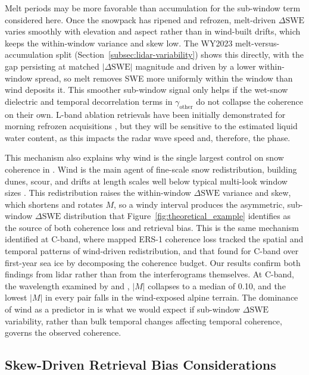 \documentclass[tc, manuscript]{copernicus}
\begin{document}
Melt periods may be more favorable than accumulation for the sub-window term considered here. Once the snowpack has ripened and refrozen, melt-driven $\Delta\mathrm{SWE}$ varies smoothly with elevation and aspect rather than in wind-built drifts, which keeps the within-window variance and skew low. The WY2023 melt-versus-accumulation split (Section~\ref{subsec:lidar-variability}) shows this directly, with the gap persisting at matched $|\Delta\mathrm{SWE}|$ magnitude and driven by a lower within-window spread, so melt removes SWE more uniformly within the window than wind deposits it. This smoother sub-window signal only helps if the wet-snow dielectric and temporal decorrelation terms in $\gamma_\mathrm{other}$ do not collapse the coherence on their own. L-band ablation retrievals have been initially demonstrated for morning refrozen acquisitions \citep{Tarricone2023}, but they will be sensitive to the estimated liquid water content, as this impacts the radar wave speed and, therefore, the phase.

This mechanism also explains why wind is the single largest control on snow coherence in \citet{Ruiz2022}. Wind is the main agent of fine-scale snow redistribution, building dunes, scour, and drifts at length scales well below typical multi-look window sizes \citep{trujillo2007topographic-0ec}. This redistribution raises the within-window $\Delta\mathrm{SWE}$ variance and skew, which shortens and rotates $M$, so a windy interval produces the asymmetric, sub-window $\Delta\mathrm{SWE}$ distribution that Figure~\ref{fig:theoretical_example} identifies as the source of both coherence loss and retrieval bias. This is the same mechanism \citet{LiSturm2002} identified at C-band, where mapped ERS-1 coherence loss tracked the spatial and temporal patterns of wind-driven redistribution, and that \citet{ming2026} found for C-band over first-year sea ice by decomposing the coherence budget. Our results confirm both findings from lidar rather than from the interferograms themselves. At C-band, the wavelength examined by \citet{LiSturm2002} and \citet{ming2026}, $|M|$ collapses to a median of 0.10, and the lowest $|M|$ in every pair falls in the wind-exposed alpine terrain. The dominance of wind as a predictor in \citet{Ruiz2022} is what we would expect if sub-window $\Delta\mathrm{SWE}$ variability, rather than bulk temporal changes affecting temporal coherence, governs the observed coherence.

\subsection{Skew-Driven Retrieval Bias Considerations}\label{subsec:phase-bias}
\end{document}
